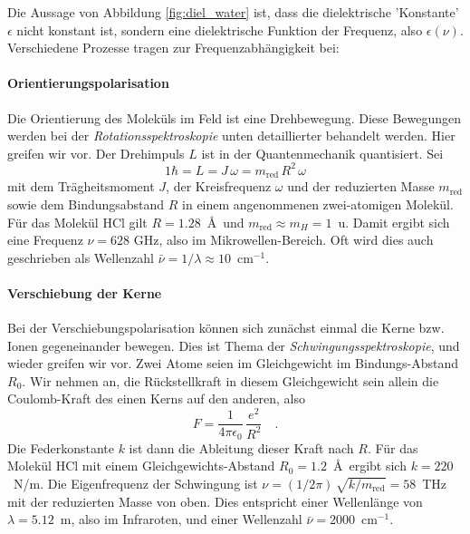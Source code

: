 Die Aussage von Abbildung \ref{fig:diel_water} ist, dass die  dielektrische 'Konstante' $\epsilon$   nicht  konstant ist, sondern eine dielektrische Funktion der Frequenz, also $\epsilon(\nu)$. Verschiedene Prozesse tragen zur Frequenzabhängigkeit bei:




\paragraph{Orientierungspolarisation} Die Orientierung des Moleküls im Feld ist eine Drehbewegung. Diese Bewegungen werden bei der \emph{Rotationsspektroskopie} unten detaillierter behandelt werden. Hier greifen wir vor. Der Drehimpuls $L$ ist in der Quantenmechanik quantisiert. Sei
\begin{equation}
1 \hbar = L = J \, \omega = m_\text{red} \, R^2 \, \omega
\end{equation}
mit dem Trägheitsmoment $J$, der Kreisfrequenz $\omega$ und der reduzierten Masse 
 $m_\text{red}$ sowie dem Bindungsabstand $R$ in einem angenommenen zwei-atomigen Molekül. Für das Molekül HCl gilt $R = 1.28$~\AA\ und $m_\text{red} \approx m_H = 1$~u. Damit ergibt sich eine Frequenz $\nu = 628$ GHz, also im Mikrowellen-Bereich. Oft wird dies auch geschrieben als Wellenzahl $\bar{\nu} = 1 /\lambda \approx 10$~cm$^{-1}$.
 
\paragraph{Verschiebung der Kerne} Bei der Verschiebungspolarisation können sich zunächst einmal die Kerne bzw. Ionen gegeneinander bewegen. Dies ist Thema der \emph{Schwingungsspektroskopie}, und wieder greifen wir vor. Zwei Atome seien im Gleichgewicht  im Bindungs-Abstand $R_0$. Wir nehmen an, die Rückstellkraft in diesem Gleichgewicht sein allein die Coulomb-Kraft des einen Kerns auf den anderen, also 
\begin{equation}
F = \frac{1}{4 \pi \epsilon_0} \, \frac{e^2}{R^2} \quad .
\end{equation}
Die Federkonstante $k$ ist dann die Ableitung dieser Kraft nach $R$. Für das Molekül HCl mit einem Gleichgewichts-Abstand $R_0 = 1.2$~\AA\ ergibt sich $k = 220$~N/m. Die Eigenfrequenz der Schwingung  ist $\nu = (1/2\pi) \, \sqrt{k/m_\text{red}} = 58$~THz mit der reduzierten Masse von oben. Dies entspricht einer Wellenlänge von $\lambda = 5.12$~\textmu m, also im Infraroten, und einer Wellenzahl $\bar{\nu} = 2000$~cm$^{-1}$.

